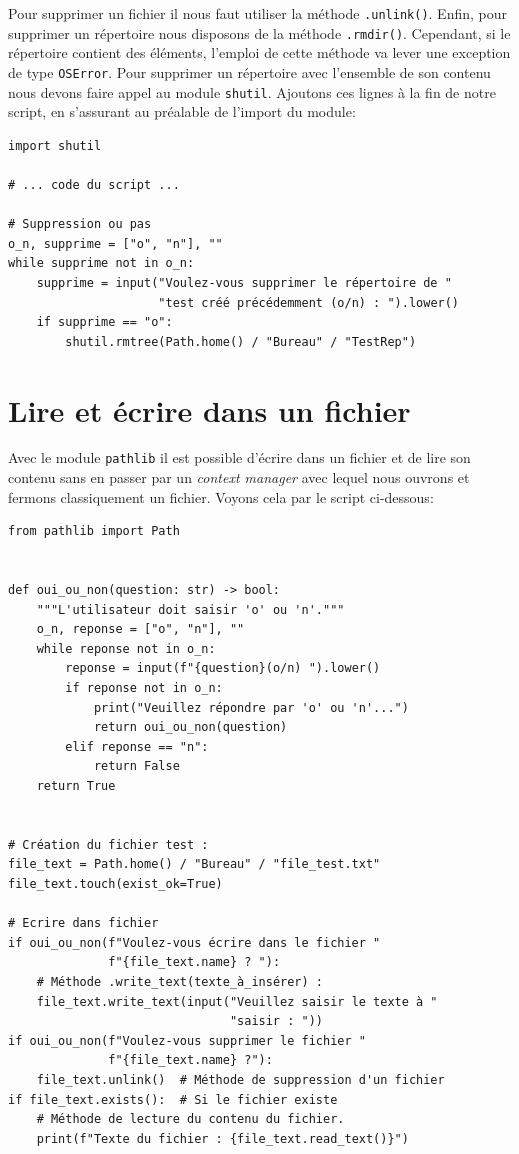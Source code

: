 \documentclass[a4paper,11pt]{book}
\begin{document}
Pour supprimer un fichier il nous faut utiliser la méthode \texttt{.unlink()}. Enfin, pour supprimer un répertoire nous disposons de la méthode \texttt{.rmdir()}. Cependant, si le répertoire contient des éléments, l'emploi de cette méthode va lever une exception de type \texttt{OSError}. Pour supprimer un répertoire avec l'ensemble de son contenu nous devons faire appel au module \texttt{shutil}. Ajoutons ces lignes à la fin de notre script, en s'assurant au préalable de l'import du module:
\begin{lstlisting}[caption=La méthode \texttt{.rmtree()} du module \texttt{shutil}]
import shutil

# ... code du script ...

# Suppression ou pas
o_n, supprime = ["o", "n"], ""
while supprime not in o_n:
    supprime = input("Voulez-vous supprimer le répertoire de "
                     "test créé précédemment (o/n) : ").lower()
    if supprime == "o":
        shutil.rmtree(Path.home() / "Bureau" / "TestRep")
\end{lstlisting}
\medskip

\section{Lire et écrire dans un fichier}
Avec le module \texttt{pathlib} il est possible d'écrire dans un fichier  et de lire son contenu sans en passer par un \textit{context manager} avec lequel nous ouvrons et fermons classiquement un fichier. Voyons cela par le script ci-dessous:
\begin{lstlisting}[caption=Ecriture dans un fichier de type \texttt{.txt}] 
from pathlib import Path


def oui_ou_non(question: str) -> bool:
    """L'utilisateur doit saisir 'o' ou 'n'."""
    o_n, reponse = ["o", "n"], ""
    while reponse not in o_n:
        reponse = input(f"{question}(o/n) ").lower()
        if reponse not in o_n:
            print("Veuillez répondre par 'o' ou 'n'...")
            return oui_ou_non(question)
        elif reponse == "n":
            return False
    return True


# Création du fichier test :
file_text = Path.home() / "Bureau" / "file_test.txt"
file_text.touch(exist_ok=True)

# Ecrire dans fichier
if oui_ou_non(f"Voulez-vous écrire dans le fichier "
              f"{file_text.name} ? "):
    # Méthode .write_text(texte_à_insérer) :
    file_text.write_text(input("Veuillez saisir le texte à "
                               "saisir : "))
if oui_ou_non(f"Voulez-vous supprimer le fichier "
              f"{file_text.name} ?"):
    file_text.unlink()  # Méthode de suppression d'un fichier
if file_text.exists():  # Si le fichier existe
    # Méthode de lecture du contenu du fichier.
    print(f"Texte du fichier : {file_text.read_text()}")
\end{lstlisting}
\medskip
\end{document}
